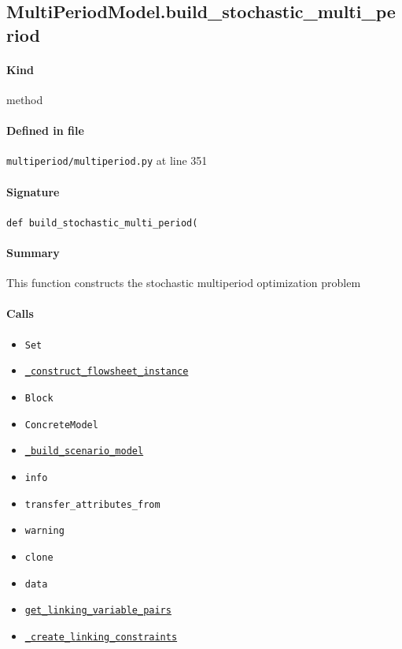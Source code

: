 \documentclass[11pt]{report}
\begin{document}
\subsection{MultiPeriodModel.build\_stochastic\_multi\_period}
\label{def:multiperiod-multiperiod.py:MultiPeriodModel.build_stochastic_multi_period:L351}
\paragraph{Kind} method
\paragraph{Defined in file} \texttt{multiperiod/multiperiod.py} at line 351
\paragraph{Signature} \texttt{def build\_stochastic\_multi\_period(}
\paragraph{Summary} This function constructs the stochastic multiperiod optimization problem
\paragraph{Calls}
\begin{itemize}[leftmargin=*]
  \item \texttt{Set}
  \item \hyperref[def:multiperiod-multiperiod.py:MultiPeriodModel._construct_flowsheet_instance:L315]{\texttt{\_construct\_flowsheet\_instance}}
  \item \texttt{Block}
  \item \texttt{ConcreteModel}
  \item \hyperref[def:multiperiod-multiperiod.py:MultiPeriodModel.build_stochastic_multi_period._build_scenario_model:L385]{\texttt{\_build\_scenario\_model}}
  \item \texttt{info}
  \item \texttt{transfer\_attributes\_from}
  \item \texttt{warning}
  \item \texttt{clone}
  \item \texttt{data}
  \item \hyperref[def:multiperiod-tests-test_multiperiod.py:get_linking_variable_pairs:L58]{\texttt{get\_linking\_variable\_pairs}}
  \item \hyperref[def:multiperiod-multiperiod.py:MultiPeriodModel._create_linking_constraints:L299]{\texttt{\_create\_linking\_constraints}}
\end{itemize}
\end{document}
